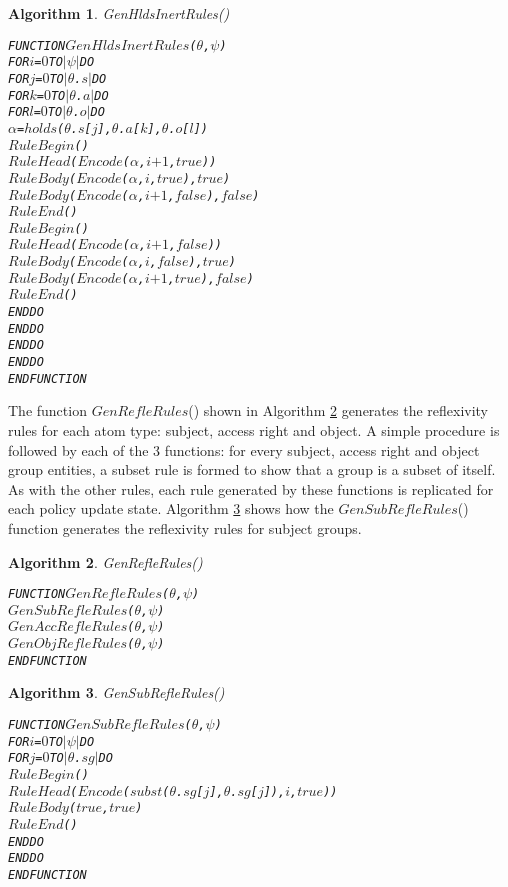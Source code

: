 \documentclass[11pt]{report}
\newenvironment{vverbatim}
{
  \begin{alltt}
}
{
    \vspace{-\baselineskip}
  \end{alltt}
}
\newtheorem{vvalgorithm}{Algorithm}[chapter]
\newenvironment{valgorithm}[2]
{
  \begin{vvalgorithm}{#1}
    \label{#2}
    \small
    \begin{vverbatim}
}
{
    \end{vverbatim}
  \end{vvalgorithm}
}
\begin{document}
          \begin{valgorithm}{GenHldsInertRules()}{algo-polup-ghinr}
FUNCTION \(GenHldsInertRules\)(\(\theta\), \(\psi\))
  FOR \(i\) = \(0\) TO \(|\psi|\) DO
    FOR \(j\) = \(0\) TO \(|\)\(\theta\).\(s\)\(|\) DO
      FOR \(k\) = \(0\) TO \(|\)\(\theta\).\(a\)\(|\) DO
        FOR \(l\) = \(0\) TO \(|\)\(\theta\).\(o\)\(|\) DO
          \(\alpha\) = \(holds\)(\(\theta\).\(s\)[\(j\)], \(\theta\).\(a\)[\(k\)], \(\theta\).\(o\)[\(l\)])
          \(RuleBegin\)()
          \(RuleHead\)(\(Encode\)(\(\alpha\), \(i\) \(+\) \(1\), \(true\)))
          \(RuleBody\)(\(Encode\)(\(\alpha\), \(i\), \(true\)), \(true\))
          \(RuleBody\)(\(Encode\)(\(\alpha\), \(i\) \(+\) \(1\), \(false\)), \(false\))
          \(RuleEnd\)()
          \(RuleBegin\)()
          \(RuleHead\)(\(Encode\)(\(\alpha\), \(i\) \(+\) \(1\), \(false\)))
          \(RuleBody\)(\(Encode\)(\(\alpha\), \(i\), \(false\)), \(true\))
          \(RuleBody\)(\(Encode\)(\(\alpha\), \(i\) \(+\) \(1\), \(true\)), \(false\))
          \(RuleEnd\)()
        ENDDO
      ENDDO
    ENDDO
  ENDDO
ENDFUNCTION
          \end{valgorithm}

          The function $GenRefleRules$() shown in Algorithm
          \ref{algo-polup-grefr} generates the reflexivity rules for each atom
          type: subject, access right and object. A simple procedure is
          followed by each of the 3 functions: for every subject, access right
          and object group entities, a subset rule is formed to
          show that a group is a subset of itself. As with the other rules,
          each rule generated by these functions is replicated for each policy
          update state. Algorithm \ref{algo-polup-gsrer} shows how the
          $GenSubRefleRules$() function generates the reflexivity rules for
          subject groups.

          \begin{valgorithm}{GenRefleRules()}{algo-polup-grefr}
FUNCTION \(GenRefleRules\)(\(\theta\), \(\psi\))
  \(GenSubRefleRules\)(\(\theta\), \(\psi\))
  \(GenAccRefleRules\)(\(\theta\), \(\psi\))
  \(GenObjRefleRules\)(\(\theta\), \(\psi\))
ENDFUNCTION
          \end{valgorithm}

          \begin{valgorithm}{GenSubRefleRules()}{algo-polup-gsrer}
FUNCTION \(GenSubRefleRules\)(\(\theta\), \(\psi\))
  FOR \(i\) = \(0\) TO \(|\psi|\) DO
    FOR \(j\) = \(0\) TO \(|\)\(\theta\).\(sg\)\(|\) DO
      \(RuleBegin\)()
      \(RuleHead\)(\(Encode\)(\(subst\)(\(\theta\).\(sg\)[\(j\)], \(\theta\).\(sg\)[\(j\)]), \(i\), \(true\)))
      \(RuleBody\)(\(true\), \(true\))
      \(RuleEnd\)()
    ENDDO
  ENDDO
ENDFUNCTION
          \end{valgorithm}
\end{document}
